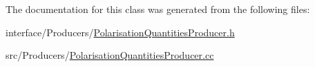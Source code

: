 The documentation for this class was generated from the following files:\begin{DoxyCompactItemize}
\item 
interface/Producers/\hyperlink{PolarisationQuantitiesProducer_8h}{PolarisationQuantitiesProducer.h}\item 
src/Producers/\hyperlink{PolarisationQuantitiesProducer_8cc}{PolarisationQuantitiesProducer.cc}\end{DoxyCompactItemize}
